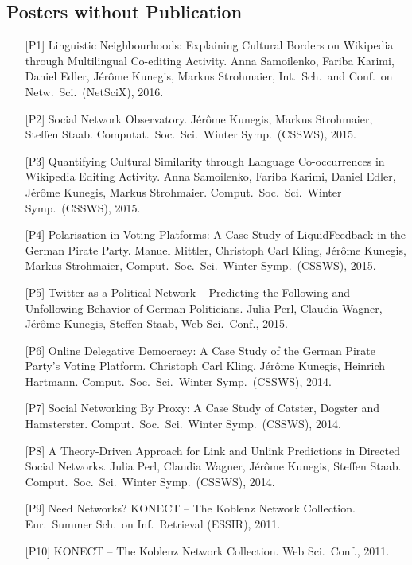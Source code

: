 \documentclass[line,mm]{res}
\newcounter{x}
\begin{document}
\begin{resume}
\section{Posters without Publication}
\begin{itemize}
  \item[{[P1]}] Linguistic Neighbourhoods:  Explaining Cultural Borders on
    Wikipedia through Multilingual Co-editing Activity.  Anna
    Samoilenko, Fariba Karimi, Daniel Edler, Jérôme Kunegis, Markus
    Strohmaier, Int.\ Sch.\ and Conf.\ on Netw.\ Sci.\ (NetSciX),
    2016. 
  \item[{[P2]}]
    Social Network Observatory.  Jérôme Kunegis, Markus Strohmaier,
    Steffen Staab.  Computat.\ Soc.\ Sci.\ Winter Symp.\ (CSSWS), 2015.
  \item[{[P3]}] 
    Quantifying Cultural Similarity through Language Co-occurrences
    in Wikipedia Editing Activity. Anna Samoilenko, Fariba Karimi,
    Daniel Edler, Jérôme Kunegis, Markus Strohmaier.  Comput.\ Soc.\ Sci.\ Winter Symp.\ (CSSWS), 2015.
  \item[{[P4]}] 
    Polarisation in Voting Platforms: A Case Study of LiquidFeedback
    in the German Pirate Party. Manuel Mittler, Christoph Carl Kling,
    Jérôme Kunegis, Markus Strohmaier, Comput.\ Soc.\ Sci.\ Winter Symp.\ (CSSWS), 2015.
  \item[{[P5]}]
    Twitter as a Political Network -- Predicting the Following and
    Unfollowing Behavior of {German} Politicians. Julia Perl, Claudia
    Wagner, Jérôme Kunegis, Steffen Staab, Web Sci.\ Conf., 2015. 
  \item[{[P6]}] 
    Online Delegative Democracy: A Case Study of the German Pirate
    Party's Voting Platform.  Christoph Carl Kling, Jérôme Kunegis,
    Heinrich Hartmann.  Comput.\ Soc.\ Sci.\ Winter
    Symp.\ (CSSWS), 2014.
  \item[{[P7]}]
    Social Networking By Proxy: A Case Study of Catster, Dogster and
    Hamsterster. Comput.\ Soc.\ Sci.\ Winter
    Symp.\ (CSSWS), 2014.
  \item[{[P8]}] 
    A Theory-Driven Approach for Link and Unlink Predictions in
    Directed Social Networks. Julia Perl, Claudia Wagner, Jérôme
    Kunegis, Steffen Staab.  Comput.\ Soc.\ Sci.\ Winter
    Symp.\ (CSSWS), 2014.
  \item[{[P9]}]
    Need Networks? KONECT -- The Koblenz Network Collection.
    Eur.\ Summer Sch.\ on Inf.\ Retrieval (ESSIR), 2011. 
  \item[{[P10]}]
    KONECT -- The Koblenz Network Collection. Web Sci.\ Conf., 2011. 

\end{itemize}
\end{resume}
\end{document}

